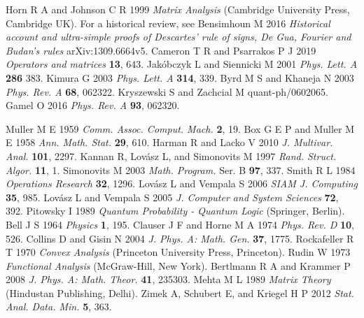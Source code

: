 \documentclass[12pt]{iopart}
\begin{document}
\begin{thebibliography}{99}
 Horn R A  and Johnson C R 1999 {\it Matrix Analysis} (Cambridge University Press, Cambridge UK).
 For a historical review, see Bensimhoun M 2016 {\it Historical account and ultra-simple proofs of Descartes' rule of signs, De Gua, Fourier and Budan's rules} arXiv:1309.6664v5.
 Cameron T R and Psarrakos P J 2019 {\it  Operators and matrices} {\bf 13}, 643.
 Jak\'obczyk L and Siennicki M 2001 {\it Phys. Lett. A} {\bf 286} 383.
 Kimura G 2003 {\it Phys. Lett. A} {\bf 314}, 339.
 Byrd M S and Khaneja N 2003 {\it Phys. Rev. A} {\bf 68}, 062322.
 Kryszewski S and Zachcial M quant-ph/0602065.
 Gamel O 2016 {\it Phys. Rev. A} {\bf 93}, 062320.

 Muller M E 1959 {\it Comm. Assoc. Comput. Mach.} {\bf 2}, 19.
 Box G E P and Muller M E 1958 {\it Ann. Math. Stat.} {\bf 29}, 610.
 Harman R and Lacko V 2010 {\it J. Multivar. Anal.} {\bf 101}, 2297.
 Kannan R, Lov\'asz L, and Simonovits M 1997 {\it  Rand. Struct.  Algor.} {\bf 11}, 1.
 Simonovits M 2003 {\it Math. Program.} Ser. B {\bf 97}, 337.
 Smith R L 1984 {\it Operations Research} {\bf 32}, 1296.
 Lov\'asz L and Vempala S 2006 {\it SIAM J. Computing} {\bf 35}, 985. 
 Lov\'asz L and Vempala S 2005 {\it J. Computer and System Sciences} {\bf 72}, 392.
 Pitowsky I 1989 {\it Quantum Probability - Quantum Logic} (Springer, Berlin).
 Bell J S 1964 {\it Physics} {\bf 1}, 195.
 Clauser J F and Horne M A 1974 {\it Phys. Rev. D} {\bf 10}, 526.
 Collins D and Gisin N 2004 {\it J. Phys. A: Math. Gen.} {\bf 37}, 1775.
 Rockafeller R T 1970 {\it Convex Analysis} (Princeton University Press, Princeton).
 Rudin W 1973 {\it Functional Analysis} (McGraw-Hill, New York).
 Bertlmann R A and Krammer P 2008 {\it J. Phys. A: Math. Theor.} {\bf 41}, 235303.
 Mehta M L 1989 {\it Matrix Theory} (Hindustan Publishing, Delhi).
 Zimek A, Schubert E, and Kriegel H P 2012 {\it Stat. Anal. Data. Min.} {\bf 5}, 363.

\end{thebibliography}
\end{document}
